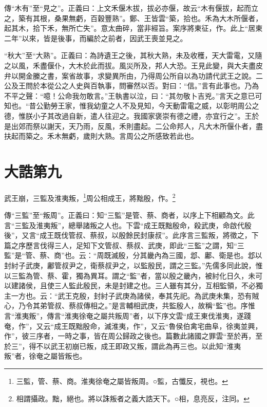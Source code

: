 {\noindent\zhuan{}\fzbyks 傳“木有”至“見之”。正義曰：上文禾偃木拔，拔必亦偃，故云“木有偃拔，起而立之，築有其根，桑果無虧，百穀豐熟”。鄭、王皆雲“築，拾也。禾為大木所偃者，起其木，拾下禾，無所亡失”。意太曲碎，當非經旨。案序將東征，作。此上“居東二年”以來，皆是後事，而編於之前者，因武王喪並見之。 \par}

{\noindent\shu{}\fzkt “秋大”至“大熟”。正義曰：為詩遺王之後，其秋大熟，未及收穫，天大雷電，又隨之以風，禾盡偃仆，大木於此而拔。風災所及，邦人大恐。王見此變，與大夫盡皮弁以開金縢之書，案省故事，求變異所由，乃得周公所自以為功請代武王之說。二公及王問於本從公之人史與百執事，問審然以否。對曰：“信。”言有此事也。乃為不平之聲：“噫！公命我勿敢言。”王執書以泣，曰：“其勿敬卜吉兇。”言天之意已可知也。“昔公勤勞王家，惟我幼童之人不及見知，今天動雷電之威，以彰明周公之德，惟朕小子其改過自新，遣人往迎之。我國家褒崇有德之禮，亦宜行之”。王於是出郊而祭以謝天，天乃雨，反風，禾則盡起。二公命邦人，凡大木所偃仆者，盡扶起而築之。禾木無虧，歲則大熟。言周公之所感致若此也。 \par}

\section{大誥第九}


武王崩，三監及淮夷叛，\footnote{三監，管、蔡、商。淮夷徐奄之屬皆叛周。○監，古懺反，視也。}周公相成王，將黜殷，作。\footnote{相謂攝政。黜，絕也。將以誅叛者之義大誥天下。○相，息亮反，注同。}

{\noindent\zhuan{}\fzbyks 傳“三監”至“叛周”。正義曰：知“三監”是管、蔡、商者，以序上下相顧為文。此言“三監及淮夷叛”，總舉諸叛之人也。下雲“成王既黜殷命，殺武庚，命啟代殷後”，又言“成王既伐管叔、蔡叔，以殷餘民封康叔”。此序言三監叛，將徵之，下篇之序歷言伐得三人，足知下文管叔、蔡叔、武庚，即此“三監”之謂，知“三監”是“管、蔡、商”也。云：“周既滅殷，分其畿內為三國，邶、鄘、衛是也。邶以封紂子武庚，鄘管叔尹之，衛蔡叔尹之，以監殷民，謂之三監。”先儒多同此說，惟以三監為管、蔡、霍，獨為異耳。謂之“監”者，當以殷之畿內，被紂化日久，未可以建諸侯，且使三人監此殷民，未是封建之也。三人雖有其分，互相監領，不必獨主一方也。云：“武王克殷，封紂子武庚為諸侯，奉其先祀。為武庚未集，恐有賊心，乃令其弟管叔、蔡叔傳相之。”是言輔相武庚，共監殷人，故稱“監”也。序惟言“淮夷叛”，傳言“淮夷徐奄之屬共叛周”者，以下序文雲“成王東伐淮夷，遂踐奄，作”，又云“成王既黜殷命，滅淮夷，作”，又云“魯侯伯禽宅曲阜，徐夷並興，作”，彼三序者，一時之事，皆在周公歸政之後也。篇數此諸國之罪雲“至於再，至於三”，得不以武王初崩已叛，成王即政又叛，謂此為再三也。以此知“淮夷叛”者，徐奄之屬皆叛也。 \par}

